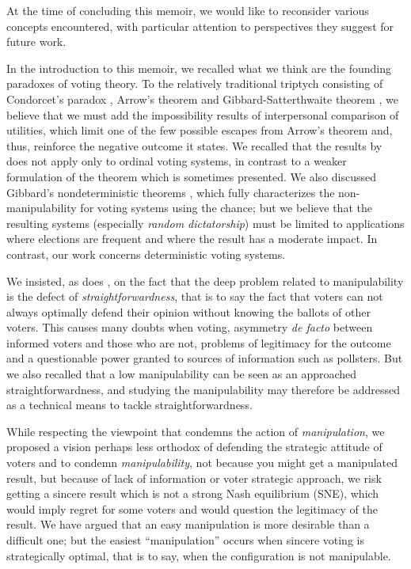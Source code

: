 \label{sec:conclusion_these}

At the time of concluding this memoir, we would like to reconsider various concepts encountered, with particular attention to perspectives they suggest for future work.

\medskip
In the introduction to this memoir, we recalled what we think are the founding paradoxes of voting theory. To the relatively traditional triptych consisting of Condorcet's paradox \citep{condorcet1785essai}, Arrow's theorem \citep{arrow1950difficulty} and Gibbard-Satterthwaite theorem \citep{gibbard1973manipulation, satterthwaite1975strategyproofness}, we believe that we must add the impossibility results of interpersonal comparison of utilities, which limit one of the few possible escapes from Arrow's theorem and, thus, reinforce the negative outcome it states. We recalled that the results by \cite{gibbard1973manipulation} does not apply only to ordinal voting systems, in contrast to a weaker formulation of the theorem which is sometimes presented. We also discussed Gibbard's nondeterministic theorems \citep{gibbard1977chance, gibbard1978lotteries}, which fully characterizes the non-manipulability for voting systems using the chance; but we believe that the resulting systems (especially \emph{random dictatorship}) must be limited to applications where elections are frequent and where the result has a moderate impact. In contrast, our work concerns deterministic voting systems.

We insisted, as does \cite{gibbard1973manipulation}, on the fact that the deep problem related to manipulability is the defect of \emph{straightforwardness}, that is to say the fact that voters can not always optimally defend their opinion without knowing the ballots of other voters. This causes many doubts when voting, asymmetry \emph{de facto} between informed voters and those who are not, problems of legitimacy for the outcome and a questionable power granted to sources of information such as pollsters. But we also recalled that a low manipulability can be seen as an approached straightforwardness, and studying the manipulability may therefore be addressed as a technical means to tackle straightforwardness.

While respecting the viewpoint that condemns the action of \emph{manipulation}, we proposed a vision perhaps less orthodox of defending the strategic attitude of voters and to condemn \emph{manipulability}, not because you might get a manipulated result, but because of lack of information or voter strategic approach, we risk getting a sincere result which is not a strong Nash equilibrium (SNE), which would imply regret for some voters and would question the legitimacy of the result. We have argued that an easy manipulation is more desirable than a difficult one; but the easiest ``manipulation'' occurs when sincere voting is strategically optimal, that is to say, when the configuration is not manipulable.

